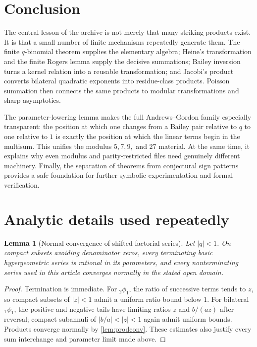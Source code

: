 \documentclass[11pt]{article}
\numberwithin{equation}{section}
\newtheorem{lemma}[theorem]{Lemma}
\theoremstyle{definition}
\theoremstyle{remark}
\begin{document}
\section{Conclusion}

The central lesson of the archive is not merely that many striking products
exist.  It is that a small number of finite mechanisms repeatedly generate
them.  The finite $q$-binomial theorem supplies the elementary algebra;
Heine's transformation and the finite Rogers lemma supply the decisive
summations; Bailey inversion turns a kernel relation into a reusable
transformation; and Jacobi's product converts bilateral quadratic exponents
into residue-class products.  Poisson summation then connects the same
products to modular transformations and sharp asymptotics.

The parameter-lowering lemma makes the full Andrews--Gordon family especially
transparent: the position at which one changes from a Bailey pair relative to
$q$ to one relative to $1$ is exactly the position at which the linear terms
begin in the multisum.  This unifies the modulus $5,7,9,$ and $27$ material.
At the same time, it explains why even modulus and parity-restricted files
need genuinely different machinery.  Finally, the separation of theorems
from conjectural sign patterns provides a safe foundation for further
symbolic experimentation and formal verification.

\appendix
\section{Analytic details used repeatedly}

\begin{lemma}[Normal convergence of shifted-factorial series]\label{lem:normal}
Let $|q|<1$.  On compact subsets avoiding denominator zeros, every terminating
basic hypergeometric series is rational in its parameters, and every
nonterminating series used in this article converges normally in the stated
open domain.
\end{lemma}
\begin{proof}
Termination is immediate.  For ${}_2\phi_1$, the ratio of successive terms
tends to $z$, so compact subsets of $|z|<1$ admit a uniform ratio bound below
$1$.  For bilateral ${}_1\psi_1$, the positive and negative tails have limiting
ratios $z$ and $b/(az)$ after reversal; compact subannuli of
$|b/a|<|z|<1$ again admit uniform bounds.  Products converge normally by
\cref{lem:prodconv}.  These estimates also justify every sum interchange and
parameter limit made above.
\end{proof}
\end{document}
